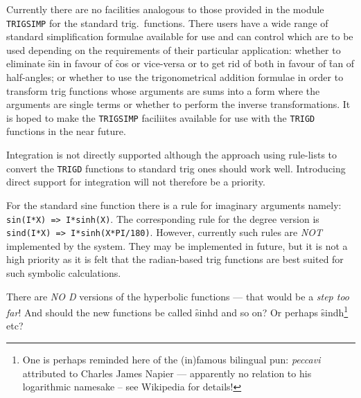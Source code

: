 Currently  there are no facilities analogous to those provided in the module \texttt{TRIGSIMP} for the standard trig.\ functions.  There users have a wide range of  standard simplification formulae available for use and can control which are to be used depending on the  requirements of their particular application: whether to eliminate
 \f{sin} in favour of \f{cos} or vice-versa or to get rid of both in favour of \f{tan} of half-angles; or whether to use the trigonometrical addition formulae in order to transform  trig functions whose arguments are sums into a form where the arguments are single terms or whether to perform the inverse transformations.  It is hoped to make the \texttt{TRIGSIMP}  faciliites available for use with the \texttt{TRIGD} functions in the near future.

Integration is not directly supported although the approach using rule-lists to convert the \texttt{TRIGD} functions  to standard trig ones should work well.  Introducing direct support for integration will not therefore be a priority. 

 For the standard sine function there is a rule for imaginary arguments namely: \texttt{sin(I*X) => I*sinh(X)}. The corresponding rule for the degree version is \texttt{sind(I*X) => I*sinh(X*PI/180)}.  However, currently such rules are \emph{NOT} implemented by the system.  They may be implemented in future, but it is not a high priority as it is felt that the radian-based trig functions are best suited  for such symbolic calculations.

There are \emph{NO D} versions of the hyperbolic functions  --- that would be a \textit{step too far}!  And should the new functions be called \f{sinhd} and so on? Or perhaps \f{sindh}\footnote{One is perhaps reminded here of the (in)famous bilingual pun: \emph{peccavi} attributed to Charles James Napier ---  apparently no relation to his logarithmic namesake -- see Wikipedia for details!} etc?

